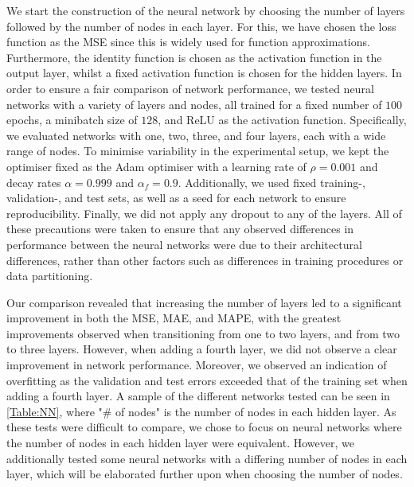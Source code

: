 We start the construction of the neural network by choosing the number of layers followed by the number of nodes in each layer. For this, we have chosen the loss function as the MSE since this is widely used for function approximations. Furthermore, the identity function is chosen as the activation function in the output layer, whilst a fixed activation function is chosen for the hidden layers. In order to ensure a fair comparison of network performance, we tested neural networks with a variety of layers and nodes, all trained for a fixed number of $100$ epochs, a minibatch size of $128$, and ReLU as the activation function. Specifically, we evaluated networks with one, two, three, and four layers, each with a wide range of nodes. To minimise variability in the experimental setup, we kept the optimiser fixed as the Adam optimiser with a learning rate of $\rho = 0.001$ and decay rates $\alpha=0.999$ and $\alpha_f=0.9$. Additionally, we used fixed training-, validation-, and test sets, as well as a seed for each network to ensure reproducibility. Finally, we did not apply any dropout to any of the layers. All of these precautions were taken to ensure that any observed differences in performance between the neural networks were due to their architectural differences, rather than other factors such as differences in training procedures or data partitioning.

Our comparison revealed that increasing the number of layers led to a significant improvement in both the MSE, MAE, and MAPE, with the greatest improvements observed when transitioning from one to two layers, and from two to three layers. However, when adding a fourth layer, we did not observe a clear improvement in network performance. Moreover, we observed an indication of overfitting as the validation and test errors exceeded that of the training set when adding a fourth layer. A sample of the different networks tested can be seen in \autoref{Table:NN}, where "\# of nodes" is the number of nodes in each hidden layer. As these tests were difficult to compare, we chose to focus on neural networks where the number of nodes in each hidden layer were equivalent. However, we additionally tested some neural networks with a differing number of nodes in each layer, which will be elaborated further upon when choosing the number of nodes.

